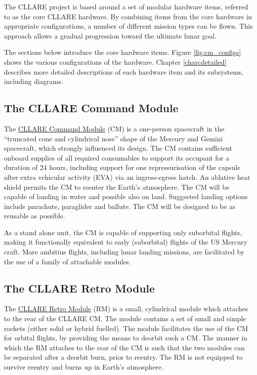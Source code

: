 \documentclass{report}
\begin{document}
The CLLARE project is based around a set of modular hardware items, referred to as the core CLLARE hardware.  By combining items from the core hardware in appropriate configurations, a number of different mission types can be flown.  This approach allows a gradual progression toward the ultimate lunar goal.

The sections below introduce the core hardware items.  Figure \ref{fig:cm_configs} shows the various configurations of the hardware.  Chapter \ref{chap:detailed} describes more detailed descriptions of each hardware item and its subsystems, including diagrams.

\subsection{The CLLARE Command Module}

The \href{http://cstart.org/wiki/CLLARE_Command_Module}{CLLARE Command Module} (CM) is a one-person spacecraft in the ``truncated cone and cylindrical nose'' shape of the Mercury and Gemini spacecraft, which strongly influenced its design.  The CM contains sufficient onboard supplies of all required consumables to support its occupant for a duration of 24 hours, including support for one repressurisation of the capsule after extra vehicular activity (EVA) via an ingress-egress hatch.  An ablative heat shield permits the CM to reenter the Earth's atmosphere.  The CM will be capable of landing in water and possible also on land.  Suggested landing options include parachute, paraglider and ballute.  The CM will be designed to be as reusable as possible.

As a stand alone unit, the CM is capable of supporting only suborbital flights, making it functionally equivalent to early (suborbital) flights of the US Mercury craft.  More ambitius flights, including lunar landing missions, are facilitated by the use of a family of attachable modules.

\subsection{The CLLARE Retro Module}

The \href{http://cstart.org/wiki/CLLARE_Retro_Module}{CLLARE Retro Module} (RM) is a small, cylindrical module which attaches to the rear of the CLLARE CM.  The module contains a set of small and simple rockets (either solid or hybrid fuelled).  The module facilitates the use of the CM for orbital flights, by providing the means to deorbit such a CM.  The manner in which the RM attaches to the rear of the CM is such that the two modules can be separated after a deorbit burn, prior to reentry.  The RM is not equipped to survive reentry and burns up in Earth's atmosphere.
\end{document}
